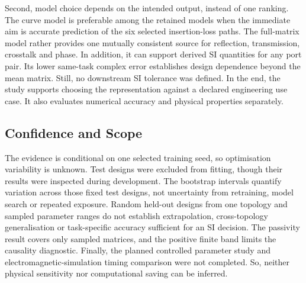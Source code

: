 Second, model choice depends on the intended output, instead of one ranking.
The curve model is preferable among the retained models when the immediate aim
is accurate prediction of the six selected insertion-loss paths. The
full-matrix model rather provides one mutually consistent source for
reflection, transmission, crosstalk and phase. In addition, it can support derived SI
quantities for any port pair. Its lower same-task complex error establishes
design dependence beyond the mean matrix. Still, no downstream SI tolerance was
defined. In the end, the study supports choosing the representation against a
declared engineering use case. It also evaluates numerical accuracy and physical
properties separately.

\subsection{Confidence and Scope}
The evidence is conditional on one selected training seed, so optimisation
variability is unknown. Test designs were excluded from fitting, though their
results were inspected during development. The bootstrap intervals quantify
variation across those fixed test designs, not uncertainty from retraining,
model search or repeated exposure. Random held-out designs from one topology
and sampled parameter ranges do not establish extrapolation, cross-topology
generalisation or task-specific accuracy sufficient for an SI decision. The
passivity result covers only sampled matrices, and the positive finite band
limits the causality diagnostic. Finally, the planned controlled parameter
study and electromagnetic-simulation timing comparison were not completed. So,
neither physical sensitivity nor computational saving can be inferred.
